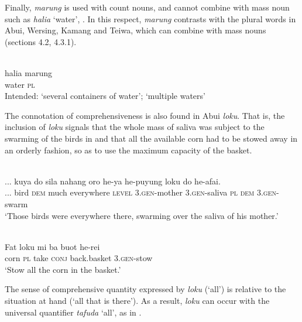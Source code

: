 Finally, \textit{marung} is used with count nouns, and cannot combine with mass noun such as \textit{halia} `water', . In this respect, \textit{marung} contrasts with the plural words in Abui, Wersing, Kamang and Teiwa, which can combine with mass nouns (sections 4.2,  4.3.1).


\ea%
\label{ex:9:68}
 \\
\gll  *halia marung \\
   water \textsc{pl}  \\
\glt Intended: `several containers of water';  `multiple waters'
\z






The connotation of comprehensiveness is also found in Abui \textit{loku}. That is, the inclusion of \textit{loku} signals that the whole mass of saliva was subject to the swarming of the birds in  and that all the available corn had to be stowed away  in an orderly fashion, so as to use the maximum capacity of the basket.


\ea%
\label{ex:9:69}
 \\
\gll  ... {kuya} do sila nahang oro  he-ya he-puyung loku do he-afai. \\
   ...  bird \textsc{dem} much everywhere \textsc{level}   \textsc{3.gen}-mother \textsc{3.gen-}saliva \textsc{pl} \textsc{dem} \textsc{3.gen-}swarm \\
\glt `Those birds were everywhere there, swarming over the saliva of his mother.'
\z













\ea%
\label{ex:9:70}
 \\
\gll  Fat loku mi ba buot he-rei \\
    corn \textsc{pl} take \textsc{conj} back.basket \textsc{3.gen-}stow \\
\glt `Stow all the corn in the basket.'
\z






The sense of comprehensive quantity expressed by \textit{loku} (`all') is relative to the situation at hand (`all that is there'). As a result, \textit{loku} can occur with the universal quantifier \textit{tafuda} `all', as in .



